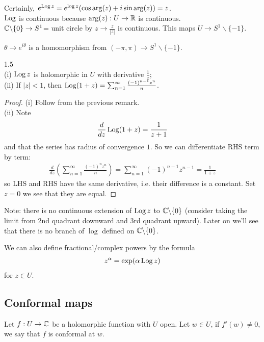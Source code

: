 \documentclass[a4paper]{article}
\begin{document}
Certainly, $e^{\operatorname{Log} z} = e^{\log z}(\cos\arg(z)+i\sin\arg(z)) = z$.\\
$\operatorname{Log}$ is continuous because $\arg(z):U \to \mathbb{R}$ is continuous.\\
$\mathbb{C} \backslash \{0 \} \to S^1$= unit circle by $z \to \frac{z}{|z|}$ is continuous. This maps $U \to S^1 \backslash \{-1\}$.

$\theta \to e^{i \theta}$ is a homomorphism from $(-\pi,\pi) \to S^1 \backslash \{-1\}$.

\begin{prop} 1.5\\
(i) $\operatorname{Log} z$ is holomorphic in $U$ with derivative $\frac{1}{z}$;\\
(ii) If $|z|<1$, then $\operatorname{Log}(1+z) = \sum_{n=1}^\infty \frac{(-1)^{n-1} z^n}{n}$.
\begin{proof}
(i) Follow from the previous remark.\\
(ii) Note
\begin{equation*}
\begin{aligned}
\frac{d}{dz} \operatorname{Log}(1+z) = \frac{1}{z+1}
\end{aligned}
\end{equation*}
and that the series has radius of convergence $1$. So we can differentiate RHS term by term:
\begin{equation*}
\begin{aligned}
\frac{d}{dz}(\sum_{n=1}^\infty \frac{(-1)^n z^n}{n}) = \sum_{n=1}^\infty (-1)^{n-1}z^{n-1} = \frac{1}{1+z}
\end{aligned}
\end{equation*}
so LHS and RHS have the same derivative, i.e. their difference is a constant. Set $z=0$ we see that they are equal.
\end{proof}

Note: there is no continuous extension of $\operatorname{Log} z$ to $\mathbb{C} \backslash \{0\}$ (consider taking the limit from 2nd quadrant downward and 3rd quadrant upward). Later on we'll see that there is no branch of $\log$ defined on $\mathbb{C} \backslash \{0\}$.

We can also define fractional/complex powers by the formula
\begin{equation*}
\begin{aligned}
z^\alpha = \exp(\alpha \operatorname{Log} z)
\end{aligned}
\end{equation*}
for $z \in U$.

\end{prop}

\subsection{Conformal maps}
Let $f:U \to \mathbb{C}$ be a holomorphic function with $U$ open. Let $w \in U$, if $f'(w) \neq 0$, we say that $f$ is conformal at $w$.
\end{document}
